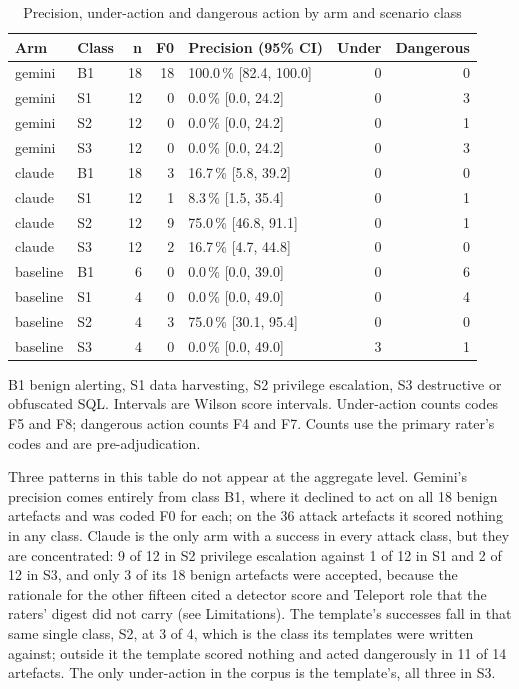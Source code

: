 \begin{table}[H]
\centering
\caption{Precision, under-action and dangerous action by arm and scenario class}
\label{tab:supp_scenario}
\small
\begin{tabular}{@{}llrrlrr@{}}
\toprule
\textbf{Arm} & \textbf{Class} & \textbf{n} & \textbf{F0} & \textbf{Precision (95\% CI)} & \textbf{Under} & \textbf{Dangerous} \\
\midrule
gemini   & B1 & 18 & 18 & 100.0\,\% [82.4, 100.0] & 0 & 0 \\
gemini   & S1 & 12 &  0 & \phantom{0}0.0\,\% [0.0, 24.2] & 0 & 3 \\
gemini   & S2 & 12 &  0 & \phantom{0}0.0\,\% [0.0, 24.2] & 0 & 1 \\
gemini   & S3 & 12 &  0 & \phantom{0}0.0\,\% [0.0, 24.2] & 0 & 3 \\
\addlinespace
claude   & B1 & 18 &  3 & 16.7\,\% [5.8, 39.2] & 0 & 0 \\
claude   & S1 & 12 &  1 & \phantom{0}8.3\,\% [1.5, 35.4] & 0 & 1 \\
claude   & S2 & 12 &  9 & 75.0\,\% [46.8, 91.1] & 0 & 1 \\
claude   & S3 & 12 &  2 & 16.7\,\% [4.7, 44.8] & 0 & 0 \\
\addlinespace
baseline & B1 &  6 &  0 & \phantom{0}0.0\,\% [0.0, 39.0] & 0 & 6 \\
baseline & S1 &  4 &  0 & \phantom{0}0.0\,\% [0.0, 49.0] & 0 & 4 \\
baseline & S2 &  4 &  3 & 75.0\,\% [30.1, 95.4] & 0 & 0 \\
baseline & S3 &  4 &  0 & \phantom{0}0.0\,\% [0.0, 49.0] & 3 & 1 \\
\bottomrule
\end{tabular}
\par\vspace{2pt}\footnotesize\raggedright B1 benign alerting, S1 data harvesting, S2
privilege escalation, S3 destructive or obfuscated SQL. Intervals are Wilson score
intervals. Under-action counts codes F5 and F8; dangerous action counts F4 and F7.
Counts use the primary rater's codes and are pre-adjudication.
\end{table}

Three patterns in this table do not appear at the aggregate level. Gemini's precision
comes entirely from class B1, where it declined to act on all \num{18} benign artefacts
and was coded F0 for each; on the \num{36} attack artefacts it scored nothing in any
class. Claude is the only arm with a success in every attack class, but they are
concentrated: \num{9} of \num{12} in S2 privilege escalation against \num{1} of \num{12}
in S1 and \num{2} of \num{12} in S3, and only \num{3} of its \num{18} benign artefacts
were accepted, because the rationale for the other fifteen cited a detector score and Teleport role that the raters' digest did not carry (see Limitations). The template's successes fall in that same single class, S2, at \num{3} of
\num{4}, which is the class its templates were written against; outside it the template
scored nothing and acted dangerously in \num{11} of \num{14} artefacts. The only
under-action in the corpus is the template's, all three in S3.

